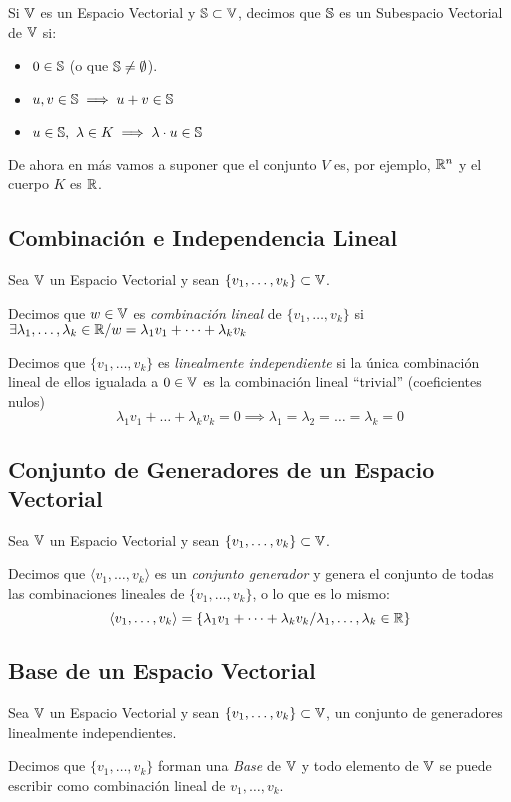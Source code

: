 \begin{defi}
	Si $\V$ es un Espacio Vectorial y $\S \subset \V$, decimos que
	$\S$ es un Subespacio Vectorial de $\V$ si:
	\begin{itemize}
		\item $0 \in \S$ (o que $\S \neq \emptyset$).
		\item $u,v \in \S \implies u + v \in \S$
		\item $u \in \S,\ \lambda \in K \implies \lambda \cdot u \in \S$
	\end{itemize}
\end{defi}

De ahora en más vamos a suponer que el conjunto $V$ es, por ejemplo, $\R^{n}$ y el cuerpo $K$ es $\R$.

\subsection{Combinación e Independencia Lineal}
Sea $\V$ un Espacio Vectorial y sean $\{v_1, \dots, v_k\} \subset \V$.
\begin{defi}
	Decimos que $w \in \V$ es \textit{combinación lineal} de $\{v_1, \dots, v_k\}$ si
	$\exists \lambda_1, \dots, \lambda_k \in \R / w = \lambda_1 v_1 + \dots + \lambda_k v_k$
\end{defi}

\begin{defi}
	Decimos que $\{v_1, \dots, v_k\}$ es \textit{linealmente independiente} si
	la única combinación lineal de ellos igualada a $0 \in \V$ es la combinación
	lineal ``trivial'' (coeficientes nulos)
	$$\lambda_1 v_1 + \dots + \lambda_k v_k = 0 \implies \lambda_1 = \lambda_2 = \dots = \lambda_k = 0$$
\end{defi}

\subsection{Conjunto de Generadores de un Espacio Vectorial}
Sea $\V$ un Espacio Vectorial y sean $\{v_1, \dots, v_k\} \subset \V$.
\begin{defi}
Decimos que $\langle v_1, \dots, v_k \rangle$ es un \textit{conjunto generador}
y genera el conjunto de todas las combinaciones lineales de $\{v_1, \dots, v_k\}$, o lo que es lo mismo:
	$$\langle v_1, \dots, v_k \rangle = \{\lambda_1 v_1 + \dots + \lambda_k v_k / \lambda_1, \dots, \lambda_k \in \R \}$$
\end{defi}

\subsection{Base de un Espacio Vectorial}
Sea $\V$ un Espacio Vectorial y sean $\{v_1, \dots, v_k\} \subset \V$, un conjunto
de generadores linealmente independientes.
\begin{defi}
	Decimos que $\{v_1, \dots, v_k\}$ forman una \textit{Base} de $\V$ y todo
	elemento de $\V$ se puede escribir como combinación lineal de $v_1, \dots, v_k$.
\end{defi}

